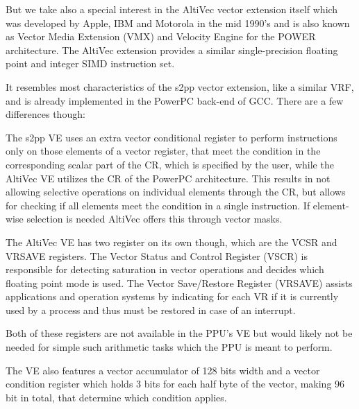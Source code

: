But we take also a special interest in the AltiVec vector extension itself which was developed by Apple, IBM and Motorola in the mid 1990's and is also known as Vector Media Extension (VMX) and Velocity Engine for the POWER architecture. 
The AltiVec extension provides a similar single-precision floating point and integer SIMD instruction set.

It resembles most characteristics of the s2pp vector extension, like a similar VRF, and is already implemented in the PowerPC back-end of GCC.
There are a few differences though:
\begin{addmargin}[2em]{0em}
    The s2pp VE uses an extra vector conditional register to perform instructions only on those elements of a vector register, that meet the condition in the corresponding scalar part of the CR, which is specified by the user, while the AltiVec VE utilizes the CR of the PowerPC architecture.
    This results in not allowing selective operations on individual elements through the CR, but allows for checking if all elements meet the condition in a single instruction.
    If element-wise selection is needed AltiVec offers this through vector masks.
    
    The AltiVec VE has two register on its own though, which are the VCSR and VRSAVE registers.
            The Vector Status and Control Register (VSCR) is responsible for detecting saturation in vector operations and decides which floating point mode is used.
            The Vector Save/Restore Register (VRSAVE) assists applications and operation systems by indicating for each VR if it is currently used by a process and thus must be restored in case of an interrupt.
    
    Both of these registers are not available in the PPU's VE but would likely not be needed for simple such arithmetic tasks which the PPU is meant to perform.
\end{addmargin}


The VE also features a vector accumulator of 128 bits width and a vector condition register which holds 3 bits for each half byte of the vector, making 96 bit in total, that determine which condition applies.

